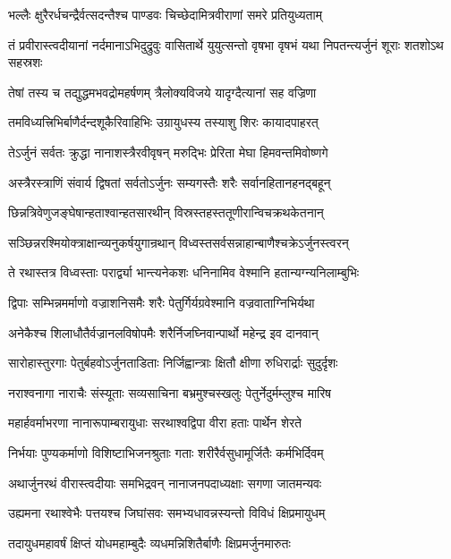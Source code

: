 \twolineshloka
{भल्लैः क्षुरैरर्धचन्द्रैर्वत्सदन्तैश्च पाण्डवः}
{चिच्छेदामित्रवीराणां समरे प्रतियुध्यताम्}


\threelineshloka
{तं प्रवीरास्त्वदीयानां नर्दमानाऽभिदुद्रुवुः}
{वासितार्थे युयुत्सन्तो वृषभा वृषभं यथा}
{निपतन्त्यर्जुनं शूराः शतशोऽथ सहस्रशः}


\twolineshloka
{तेषां तस्य च तद्युद्धमभवद्रोमहर्षणम्}
{त्रैलोक्यविजये यादृग्दैत्यानां सह वज्रिणा}


\twolineshloka
{तमविध्यत्त्रिभिर्बाणैर्दन्दशूकैरिवाहिभिः}
{उग्रायुधस्य तस्याशु शिरः कायादपाहरत्}


\twolineshloka
{तेऽर्जुनं सर्वतः क्रुद्धा नानाशस्त्रैरवीवृषन्}
{मरुद्भिः प्रेरिता मेघा हिमवन्तमिवोष्णगे}


\twolineshloka
{अस्त्रैरस्त्राणिं संवार्य द्विषतां सर्वतोऽर्जुनः}
{सम्यगस्तैः शरैः सर्वानहितानहनद्बहून्}


\twolineshloka
{छिन्नत्रिवेणुजङ्घेषान्हताश्वान्हतसारथीन्}
{विस्रस्तहस्ततूणीरान्विचक्रथकेतनान्}


\twolineshloka
{सञ्छिन्नरश्मियोक्त्राक्षान्व्यनुकर्षयुगान्रथान्}
{विध्वस्तसर्वसन्नाहान्बाणैश्चक्रेऽर्जुनस्त्वरन्}


\twolineshloka
{ते रथास्तत्र विध्वस्ताः परार्द्व्या भान्त्यनेकशः}
{धनिनामिव वेश्मानि हतान्यग्न्यनिलाम्बुभिः}


\twolineshloka
{द्विपाः सम्भिन्नमर्माणो वज्राशनिसमैः शरैः}
{पेतुर्गिर्यग्रवेश्मानि वज्रवाताग्निभिर्यथा}


\twolineshloka
{अनेकैश्च शिलाधौतैर्वज्रानलविषोपमैः}
{शरैर्निजघ्निवान्पार्थो महेन्द्र इव दानवान्}


\twolineshloka
{सारोहास्तुरगाः पेतुर्बहवोऽर्जुनताडिताः}
{निर्जिह्वान्त्राः क्षितौ क्षीणा रुधिरार्द्राः सुदुर्दृशः}


\twolineshloka
{नराश्वनागा नाराचैः संस्यूताः सव्यसाचिना}
{बभ्रमुश्चस्खलुः पेतुर्नेदुर्मम्लुश्च मारिष}


\twolineshloka
{महार्हवर्माभरणा नानारूपाम्बरायुधाः}
{सरथाश्वद्विपा वीरा हताः पार्थेन शेरते}


\twolineshloka
{निर्भयाः पुण्यकर्माणो विशिष्टाभिजनश्रुताः}
{गताः शरीरैर्वसुधामूर्जितैः कर्मभिर्दिवम्}


\twolineshloka
{अथार्जुनरथं वीरास्त्वदीयाः समभिद्रवन्}
{नानाजनपदाध्यक्षाः सगणा जातमन्यवः}


\twolineshloka
{उह्यमना रथाश्वेभैः पत्तयश्च जिघांसवः}
{समभ्यधावन्नस्यन्तो विविधं क्षिप्रमायुधम्}


\twolineshloka
{तदायुधमहावर्षं क्षिप्तं योधमहाम्बुदैः}
{व्यधमन्निशितैर्बाणैः क्षिप्रमर्जुनमारुतः}


